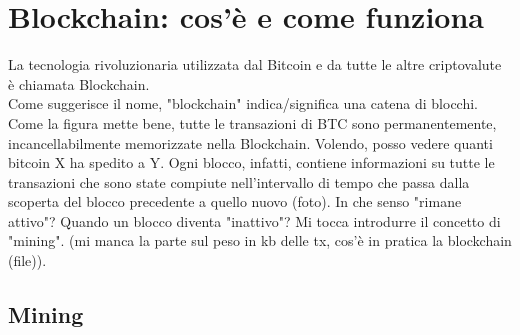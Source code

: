 \documentclass {article}
\begin{document}
\section {Blockchain: cos'è e come funziona}


La tecnologia rivoluzionaria utilizzata dal Bitcoin e da tutte le altre criptovalute è chiamata Blockchain.\\
Come suggerisce il nome, "blockchain" indica/significa una catena di blocchi.
Come la figura mette bene, tutte le transazioni di BTC sono permanentemente, incancellabilmente memorizzate nella Blockchain.
Volendo, posso vedere quanti bitcoin X ha spedito a Y.
Ogni blocco, infatti, contiene informazioni su tutte le transazioni che sono state compiute nell'intervallo di tempo che passa dalla scoperta del blocco precedente a quello nuovo (foto).
In che senso "rimane attivo"? Quando un blocco diventa "inattivo"?
Mi tocca introdurre il concetto di "mining". (mi manca la parte sul peso in kb delle tx, cos'è in pratica la blockchain (file)).


\subsection {Mining}
\end{document}
